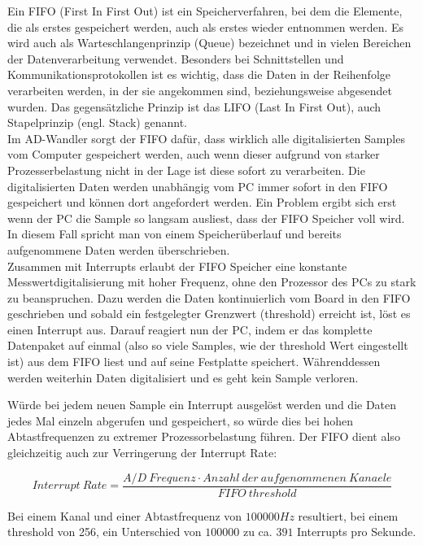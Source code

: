\documentclass[12pt,a4paper]{scrartcl}
\begin{document}
Ein FIFO (First In First Out) ist ein Speicherverfahren, bei dem die Elemente, die als erstes gespeichert werden, auch als erstes wieder entnommen werden. Es wird auch als Warteschlangenprinzip (Queue) bezeichnet und in vielen Bereichen der Datenverarbeitung verwendet. Besonders bei Schnittstellen und Kommunikationsprotokollen ist es wichtig, dass die Daten in der Reihenfolge verarbeiten werden, in der sie angekommen sind, beziehungsweise abgesendet wurden. Das gegensätzliche Prinzip ist das LIFO (Last In First Out), auch Stapelprinzip (engl. Stack) genannt.\\

Im AD-Wandler sorgt der FIFO dafür, dass wirklich alle digitalisierten Samples vom Computer gespeichert werden, auch wenn dieser aufgrund von starker Prozesserbelastung nicht in der Lage ist diese sofort zu verarbeiten. Die digitalisierten Daten werden unabhängig vom PC immer sofort in den FIFO gespeichert und können dort angefordert werden. Ein Problem ergibt sich erst wenn der PC die Sample so langsam ausliest, dass der FIFO Speicher voll wird. In diesem Fall spricht man von einem Speicherüberlauf und bereits aufgenommene Daten werden überschrieben.\\


Zusammen mit Interrupts erlaubt der FIFO Speicher eine konstante Messwertdigitalisierung mit hoher Frequenz, ohne den Prozessor des PCs zu stark zu beanspruchen. Dazu werden die Daten kontinuierlich vom Board in den FIFO geschrieben und sobald ein festgelegter Grenzwert (threshold) erreicht ist, löst es einen Interrupt aus. Darauf reagiert nun der PC, indem er das komplette Datenpaket auf einmal (also so viele Samples, wie der threshold Wert eingestellt ist) aus dem FIFO liest und auf seine Festplatte speichert. Währenddessen werden weiterhin Daten digitalisiert und es geht kein Sample verloren.

Würde bei jedem neuen Sample ein Interrupt ausgelöst werden und die Daten jedes Mal einzeln abgerufen und gespeichert, so würde dies bei hohen Abtastfrequenzen zu extremer Prozessorbelastung führen. Der FIFO dient also gleichzeitig auch zur Verringerung der Interrupt Rate:

\begin{equation}
Interrupt ~Rate = \frac{A/D ~Frequenz \cdot Anzahl ~der ~aufgenommenen ~Kanaele}{FIFO ~threshold}
\end{equation}

Bei einem Kanal und einer Abtastfrequenz von $100000 Hz$ resultiert, bei einem threshold von 256, ein Unterschied von $100000$ zu ca. $391$ Interrupts pro Sekunde.
\end{document}
